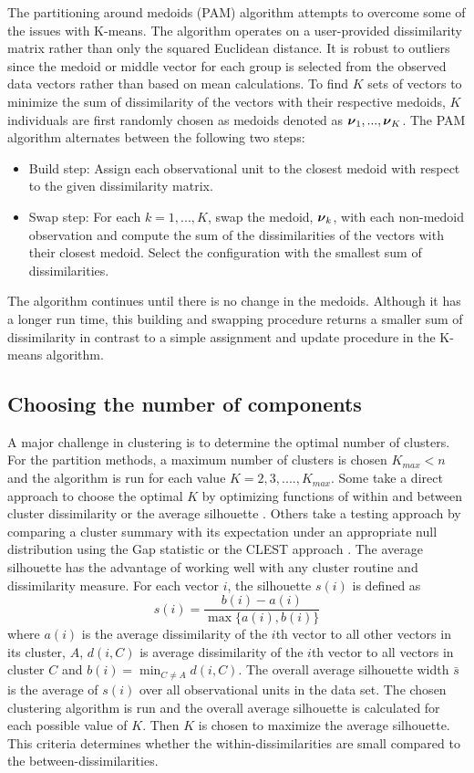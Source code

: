 The partitioning around medoids (PAM) algorithm attempts to overcome some of the issues with K-means. The algorithm operates on a user-provided dissimilarity matrix rather than only the squared Euclidean distance. It is robust to outliers since the medoid or middle vector for each group is selected from the observed data vectors rather than based on mean calculations. To find $K$ sets of vectors to minimize the sum of dissimilarity of the vectors with their respective medoids, $K$ individuals are first randomly chosen as medoids denoted as $\boldsymbol \nu_{1},...,\boldsymbol \nu_{K}$. The PAM algorithm alternates between the following two steps:
 \begin{itemize}
\item Build step: Assign each observational unit to the closest medoid with respect to the given dissimilarity matrix.
\item Swap step: For each $k=1,...,K$, swap the medoid, $\boldsymbol\nu_{k}$, with each non-medoid observation and compute the sum of the dissimilarities of the vectors with their closest medoid. Select the configuration with the smallest sum of dissimilarities.
\end{itemize}
The algorithm continues until there is no change in the medoids. Although it has a longer run time, this building and swapping procedure returns a smaller sum of dissimilarity in contrast to a simple assignment and update procedure in the K-means algorithm. 

\subsection{Choosing the number of components}
A major challenge in clustering is to determine the optimal number of clusters. For the partition methods, a maximum number of clusters is chosen $K_{max}<n$ and the algorithm is run for each value $K=2,3,....,K_{max}$. Some take a direct approach to choose the optimal $K$  by optimizing functions of within and between cluster dissimilarity \cite{mulligan1985} or the average silhouette \cite{kaufman1990}. Others take a testing approach by comparing a cluster summary with its expectation under an appropriate null distribution using the Gap statistic \cite{tibshirani2001} or the CLEST approach \cite{dudoit2002}. The average silhouette has the advantage of working well with any cluster routine and dissimilarity measure. For each vector $i$, the silhouette $s(i)$ is defined as
$$s(i)=\frac{b(i)-a(i)}{\max\{a(i),b(i)\}}$$
where $a(i)$ is the average dissimilarity of the $i$th vector to all other vectors in its cluster, $A$, $d(i,C)$ is average dissimilarity of the $i$th vector to all vectors in cluster $C$ and $b(i)=\min_{C\not= A} d(i,C)$. The overall average silhouette width $\bar{s}$ is the average of $s(i)$ over all observational units in the data set. The chosen clustering algorithm is run and the overall average silhouette is calculated for each possible value of $K$. Then $K$ is chosen to maximize the average silhouette. This criteria determines whether the within-dissimilarities are small compared to the between-dissimilarities. 

